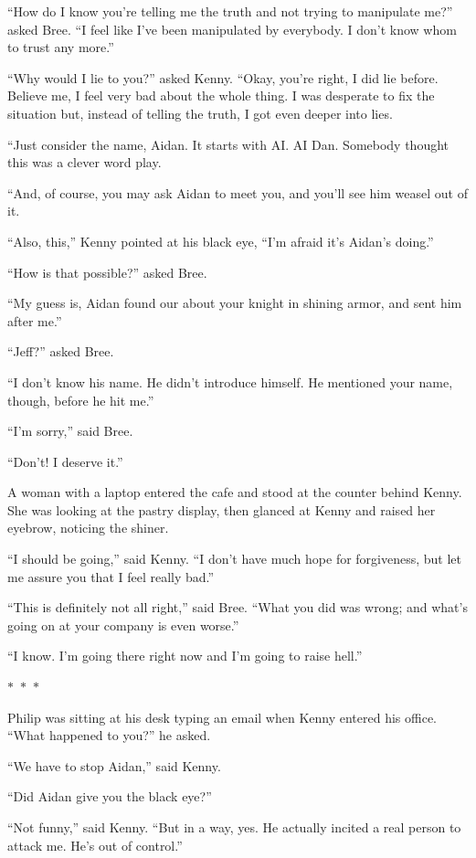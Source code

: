 \documentclass{memoir}
\newcommand{\starbreak}{%
\begin{center}
  $\ast$~$\ast$~$\ast$
\end{center}
}
\begin{document}
``How do I know you're telling me the truth and not trying to manipulate me?'' asked Bree. ``I feel like I've been manipulated by everybody. I don't know whom to trust any more.''

``Why would I lie to you?'' asked Kenny. ``Okay, you're right, I did lie before. Believe me, I feel very bad about the whole thing. I was desperate to fix the situation but, instead of telling the truth, I got even deeper into lies.

``Just consider the name, Aidan. It starts with AI. AI Dan. Somebody thought this was a clever word play. 

``And, of course, you may ask Aidan to meet you, and you'll see him weasel out of it. 

``Also, this,'' Kenny pointed at his black eye, ``I'm afraid it's Aidan's doing.''

``How is that possible?'' asked Bree.

``My guess is, Aidan found our about your knight in shining armor, and sent him after me.''

``Jeff?'' asked Bree.

``I don't know his name. He didn't introduce himself. He mentioned your name, though, before he hit me.''

``I'm sorry,'' said Bree. 

``Don't! I deserve it.''

A woman with a laptop entered the cafe and stood at the counter behind Kenny. She was looking at the pastry display, then glanced at Kenny and raised her eyebrow, noticing the shiner. 

``I should be going,'' said Kenny. ``I don't have much hope for forgiveness, but let me assure you that I feel really bad.''

``This is definitely not all right,'' said Bree. ``What you did was wrong; and what's going on at your company is even worse.''

``I know. I'm going there right now and I'm going to raise hell.''


\starbreak


Philip was sitting at his desk typing an email when Kenny entered his office.
``What happened to you?'' he asked.

``We have to stop Aidan,'' said Kenny.

``Did Aidan give you the black eye?''

``Not funny,'' said Kenny. ``But in a way, yes. He actually incited a real person to attack me. He's out of control.''
\end{document}
